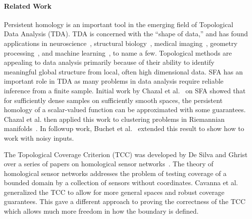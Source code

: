 \paragraph{Related Work}


Persistent homology is an important tool in the emerging field of Topological Data Analysis (TDA).
TDA is concerned with the ``shape of data,'' and has found applications in
neuroscience~\cite{saggar2018towards, sizemore2019importance},
structural biology~\cite{gameiro2015topological,kovacev2016using,dey2018protein},
medical imaging~\cite{carlsson2008local,robins2011theory,bendich2016persistent},
geometry processing~\cite{skraba2010persistence,poulenard2018topological,bruel2020topology},
and machine learning~\cite{clough2019explicit,chen2019topological,carlsson2020topological,gabrielsson2020topology}, to name a few.
Topological methods are appealing to data analysis primarily because of their ability to identify meaningful global structure from local, often high dimensional data.
SFA has an important role in TDA as many problems in data analysis require reliable inference from a finite sample.
Initial work by Chazal et al.~\cite{chazal09analysis} on SFA showed that for sufficiently dense samples on sufficiently smooth spaces, the persistent homology of a scalar-valued function can be approximated with some guarantees.
Chazal et al. then applied this work to clustering problems in Riemannian manifolds~\cite{chazal2013persistence}.
In followup work, Buchet et al.~\cite{buchet15topological} extended this result to show how to work with noisy inputs.

The Topological Coverage Criterion (TCC) was developed by De Silva and Ghrist over a series of papers on homological sensor networks~\cite{desilva06coordinate,desilva07coverage,desilva07homological}.
The theory of homological sensor networks addresses the problem of testing coverage of a bounded domain by a collection of sensors without coordinates.
Cavanna et al.~\cite{cavanna2017when} generalized the TCC to allow for more general spaces and robust coverage guarantees.
This gave a different approach to proving the correctness of the TCC which allows much more freedom in how the boundary is defined.


